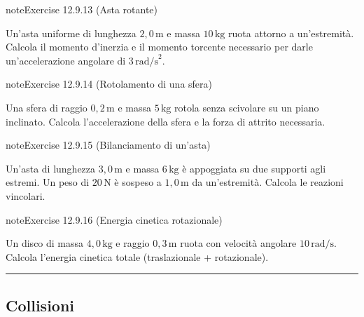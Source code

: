 \documentclass[letterpaper,10pt,italian]{jupyterBook}
\begin{document}
\begin{sphinxadmonition}{note}{Exercise 12.9.13 (Asta rotante)}



\sphinxAtStartPar
Un’asta uniforme di lunghezza \(2,0 \, \text{m}\) e massa \(10 \, \text{kg}\) ruota attorno a un’estremità. Calcola il momento d’inerzia e il momento torcente necessario per darle un’accelerazione angolare di \(3 \, \text{rad/s}^2\).
\end{sphinxadmonition}
 \label{exercise:ch/mechanics/dynamics-problems-exercise-13}

\begin{sphinxadmonition}{note}{Exercise 12.9.14 (Rotolamento di una sfera)}



\sphinxAtStartPar
Una sfera di raggio \(0,2 \, \text{m}\) e massa \(5 \, \text{kg}\) rotola senza scivolare su un piano inclinato. Calcola l’accelerazione della sfera e la forza di attrito necessaria.
\end{sphinxadmonition}
 \label{exercise:ch/mechanics/dynamics-problems-exercise-14}

\begin{sphinxadmonition}{note}{Exercise 12.9.15 (Bilanciamento di un’asta)}



\sphinxAtStartPar
Un’asta di lunghezza \(3,0 \, \text{m}\) e massa \(6 \, \text{kg}\) è appoggiata su due supporti agli estremi. Un peso di \(20 \, \text{N}\) è sospeso a \(1,0 \, \text{m}\) da un’estremità. Calcola le reazioni vincolari.
\end{sphinxadmonition}
 \label{exercise:ch/mechanics/dynamics-problems-exercise-15}

\begin{sphinxadmonition}{note}{Exercise 12.9.16 (Energia cinetica rotazionale)}



\sphinxAtStartPar
Un disco di massa \(4,0 \, \text{kg}\) e raggio \(0,3 \, \text{m}\) ruota con velocità angolare \(10 \, \text{rad/s}\). Calcola l’energia cinetica totale (traslazionale + rotazionale).
\end{sphinxadmonition}


\bigskip\hrule\bigskip



\subsection{Collisioni}
\label{\detokenize{ch/mechanics/dynamics-problems:collisioni}} \label{exercise:ch/mechanics/dynamics-problems-exercise-16}
\end{document}
